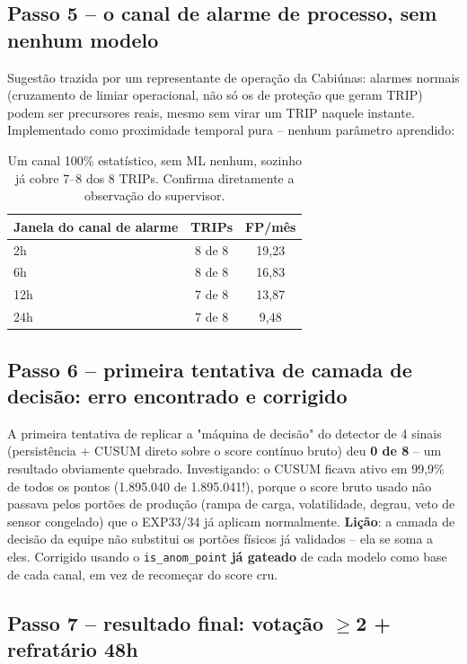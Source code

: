 \documentclass[11pt,a4paper]{article}
\begin{document}
\subsection{Passo 5 -- o canal de alarme de processo, sem nenhum modelo}

Sugestão trazida por um representante de operação da Cabiúnas: alarmes
normais (cruzamento de limiar operacional, não só os de proteção que
geram TRIP) podem ser precursores reais, mesmo sem virar um TRIP
naquele instante. Implementado como proximidade temporal pura --
nenhum parâmetro aprendido:

\begin{table}[H]
\centering
\begin{tabular}{lcc}
\toprule
\textbf{Janela do canal de alarme} & \textbf{TRIPs} & \textbf{FP/mês} \\
\midrule
2h & 8 de 8 & 19,23 \\
6h & 8 de 8 & 16,83 \\
12h & 7 de 8 & 13,87 \\
24h & 7 de 8 & 9,48 \\
\bottomrule
\end{tabular}
\caption{Um canal 100\% estatístico, sem ML nenhum, sozinho já cobre
7--8 dos 8 TRIPs. Confirma diretamente a observação do supervisor.}
\end{table}

\subsection{Passo 6 -- primeira tentativa de camada de decisão: erro encontrado e corrigido}

A primeira tentativa de replicar a "máquina de decisão" do detector de
4 sinais (persistência + CUSUM direto sobre o score contínuo bruto)
deu \textbf{0 de 8} -- um resultado obviamente quebrado. Investigando:
o CUSUM ficava ativo em 99,9\% de todos os pontos (1.895.040 de
1.895.041!), porque o score bruto usado não passava pelos portões de
produção (rampa de carga, volatilidade, degrau, veto de sensor
congelado) que o EXP33/34 já aplicam normalmente. \textbf{Lição}: a
camada de decisão da equipe não substitui os portões físicos já
validados -- ela se soma a eles. Corrigido usando o
\texttt{is\_anom\_point} \textbf{já gateado} de cada modelo como base
de cada canal, em vez de recomeçar do score cru.

\subsection{Passo 7 -- resultado final: votação $\geq$2 + refratário 48h}
\end{document}
